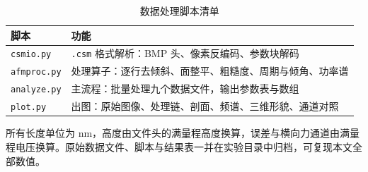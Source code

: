 \begin{table}[H]
\centering
\caption{数据处理脚本清单}
\label{tab:code}
\small
{}
\begin{tabularx}{\textwidth}{@{}lX@{}}
\toprule
脚本 & 功能 \\
\midrule
\texttt{csmio.py} & \texttt{.csm} 格式解析：BMP 头、像素反编码、参数块解码 \\
\texttt{afmproc.py} & 处理算子：逐行去倾斜、面整平、粗糙度、周期与倾角、功率谱 \\
\texttt{analyze.py} & 主流程：批量处理九个数据文件，输出参数表与数组 \\
\texttt{plot.py} & 出图：原始图像、处理链、剖面、频谱、三维形貌、通道对照 \\
\bottomrule
\end{tabularx}
\end{table}

所有长度单位为 nm，高度由文件头的满量程高度换算，误差与横向力通道由满量程电压换算。原始数据文件、脚本与结果表一并在实验目录中归档，可复现本文全部数值。


